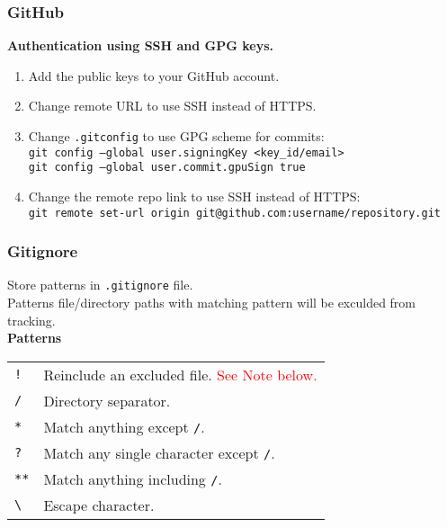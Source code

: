 \subsubsection*{GitHub}
\textbf{Authentication using SSH and GPG keys.}
\begin{enumerate}
\item Add the public keys to your GitHub account.\\
\item Change remote URL to use SSH instead of HTTPS.\\
\item Change \texttt{.gitconfig} to use GPG scheme for commits:\\
        \texttt{git config --global user.signingKey <key\_id/email>}\\
        \texttt{git config --global user.commit.gpuSign true}\\
\item Change the remote repo link to use SSH instead of HTTPS:\\
        \texttt{git remote set-url origin git@github.com:username/repository.git}
\end{enumerate}


\subsubsection*{Gitignore}

Store patterns in \texttt{.gitignore} file.\\
Patterns file/directory paths with matching pattern will be exculded from tracking.\\

\textbf{Patterns}\\
\begin{tabularx}{\linewidth}{lX}
    \texttt{!}              & Reinclude an excluded file. \textcolor{red}{See Note below.}\\
    \texttt{/}              & Directory separator.\\
    \texttt{*}              & Match anything except \texttt{/}.\\
    \texttt{?}              & Match any single character except \texttt{/}.\\
    \texttt{**}             & Match anything including \texttt{/}.\\
    \texttt{\textbackslash} & Escape character.\\
    \hline    
\end{tabularx}

